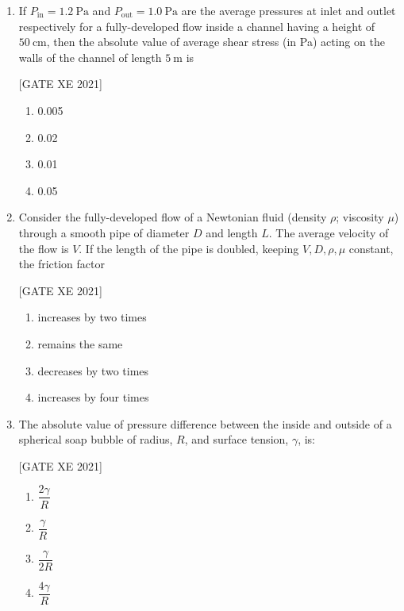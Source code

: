 \documentclass[journal,12pt,onecolumn]{IEEEtran}
\theoremstyle{remark}
\begin{document}
\begin{enumerate}
\vspace{0.8\baselineskip}

\item If $P_{\text{in}}=1.2\ \text{Pa}$ and $P_{\text{out}}=1.0\ \text{Pa}$ are the average pressures at inlet and outlet respectively for a fully-developed flow inside a channel having a height of $50\ \text{cm}$, then the absolute value of average shear stress (in Pa) acting on the walls of the channel of length $5\ \text{m}$ is


\hfill[GATE XE 2021]


\begin{multicols}{2}
\begin{enumerate}
\item 0.005
\item 0.02
\item 0.01
\item 0.05
\end{enumerate}
\end{multicols}

\vspace{0.8\baselineskip}

\item Consider the fully-developed flow of a Newtonian fluid (density $\rho$; viscosity $\mu$) through a smooth pipe of diameter $D$ and length $L$. The average velocity of the flow is $V$. If the length of the pipe is doubled, keeping $V, D, \rho, \mu$ constant, the friction factor


\hfill[GATE XE 2021]


\begin{multicols}{2}
\begin{enumerate}
\item increases by two times
\item remains the same
\item decreases by two times
\item increases by four times
\end{enumerate}
\end{multicols}

\vspace{0.8\baselineskip}

\item The absolute value of pressure difference between the inside and outside of a spherical soap bubble of radius, $R$, and surface tension, $\gamma$, is:


\hfill[GATE XE 2021]


\begin{multicols}{2}
\begin{enumerate}
\item $\dfrac{2\gamma}{R}$
\item $\dfrac{\gamma}{R}$
\item $\dfrac{\gamma}{2R}$
\item $\dfrac{4\gamma}{R}$
\end{enumerate}
\end{multicols}


\end{enumerate}
\end{document}
